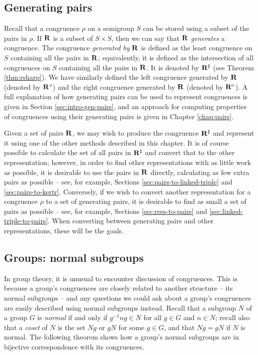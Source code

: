 \subsection{Generating pairs}
\label{sec:converting-pairs}
Recall that a congruence $\rho$ on a semigroup $S$ can be stored using
a subset of the pairs in $\rho$.  If $\mathbf{R}$ is a subset of $S \times S$,
then we can say that $\mathbf{R}$ \textit{generates} a congruence.  The
congruence \textit{generated by} $\mathbf{R}$ is defined as the least congruence
on $S$ containing all the pairs in $\mathbf{R}$; equivalently, it is defined as
the intersection of all congruences on $S$ containing all the pairs in
$\mathbf{R}$.  It is denoted by $\mathbf{R}^\sharp$ (see Theorem
\ref{thm:rsharp}).  We have similarly defined the left congruence generated by
$\mathbf{R}$ (denoted by $\mathbf{R}^\triangleleft$) and the right congruence
generated by $\mathbf{R}$ (denoted by $\mathbf{R}^\triangleright$).
A full explanation of how generating pairs can be used to represent congruences
is given in Section \ref{sec:intro-gen-pairs}, and an approach for computing
properties of congruences using their generating pairs is given in Chapter
\ref{chap:pairs}.

Given a set of pairs $\mathbf{R}$, we may wish to produce the congruence
$\mathbf{R}^\sharp$ and represent it using one of the other methods described in
this chapter.  It is of course possible to calculate the set of all pairs in
$\mathbf{R}^\sharp$ and convert that to the other representation; however, in
order to find other representations with as little work as possible, it is
desirable to use the pairs in $\mathbf{R}$ directly, calculating as few extra
pairs as possible -- see, for example, Sections \ref{sec:pairs-to-linked-triple}
and \ref{sec:pairs-to-kertr}.  Conversely, if we wish to convert another
representation for a congruence $\rho$ to a set of generating pairs, it is
desirable to find as small a set of pairs as possible -- see, for example,
Sections \ref{sec:rees-to-pairs} and \ref{sec:linked-triple-to-pairs}.  When
converting between generating pairs and other representations, these will be the
goals.

\subsection{Groups: normal subgroups}
\label{sec:normal-subgroups}

In group theory, it is unusual to encounter discussion of congruences.  This is
because a group's congruences are closely related to another structure -- its
normal subgroups -- and any questions we could ask about a group's congruences are
easily described using normal subgroups instead.  Recall that a subgroup $N$ of
a group $G$ is \textit{normal} if and only if $g^{-1}ng \in N$ for all $g \in G$
and $n \in N$; recall also that a \textit{coset} of $N$ is the set $Ng$ or $gN$
for some $g \in G$, and that $Ng=gN$ if $N$ is normal.  The following theorem
shows how a group's normal subgroups are in bijective correspondence with its
congruences.

